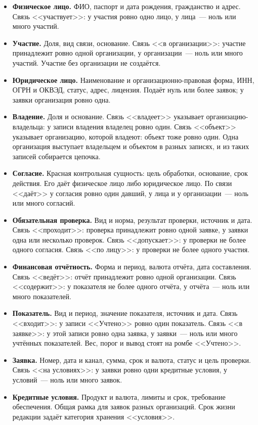 \begin{itemize}
\item \textbf{Физическое лицо.} ФИО, паспорт и дата рождения, гражданство и адрес. Связь <<участвует>>: у участия ровно одно лицо, у лица~--- ноль или много участий.
\item \textbf{Участие.} Доля, вид связи, основание. Связь <<в организации>>: участие принадлежит ровно одной организации, у организации~--- ноль или много участий. Участие без организации не создаётся.
\item \textbf{Юридическое лицо.} Наименование и организационно-правовая форма, ИНН, ОГРН и ОКВЭД, статус, адрес, лицензия. Подаёт нуль или более заявок; у заявки организация ровно одна.
\item \textbf{Владение.} Доля и основание. Связь <<владеет>> указывает организацию-владельца: у записи владения владелец ровно один. Связь <<объект>> указывает организацию, которой владеют: объект тоже ровно один. Одна организация выступает владельцем и объектом в разных записях, и из таких записей собирается цепочка.
\item \textbf{Согласие.} Красная контрольная сущность: цель обработки, основание, срок действия. Его даёт физическое лицо либо юридическое лицо. По связи <<даёт>> у согласия ровно один давший, у лица и у организации~--- ноль или много согласий.
\item \textbf{Обязательная проверка.} Вид и норма, результат проверки, источник и дата. Связь <<проходит>>: проверка принадлежит ровно одной заявке, у заявки одна или несколько проверок. Связь <<допускает>>: у проверки не более одного согласия. Связь <<по лицу>>: у проверки не более одного участия.
\item \textbf{Финансовая отчётность.} Форма и период, валюта отчёта, дата составления. Связь <<ведёт>>: отчёт принадлежит ровно одной организации. Связь <<содержит>>: у показателя не более одного отчёта, у отчёта~--- ноль или много показателей.
\item \textbf{Показатель.} Вид и период, значение показателя, источник и дата. Связь <<входит>>: у записи <<Учтено>> ровно один показатель. Связь <<в заявке>>: у этой записи ровно одна заявка, у заявки~--- ноль или много учтённых показателей. Вес, порог и вывод стоят на ромбе <<Учтено>>.
\item \textbf{Заявка.} Номер, дата и канал, сумма, срок и валюта, статус и цель проверки. Связь <<на условиях>>: у заявки ровно одни кредитные условия, у условий~--- ноль или много заявок.
\item \textbf{Кредитные условия.} Продукт и валюта, лимиты и срок, требование обеспечения. Общая рамка для заявок разных организаций. Срок жизни редакции задаёт категория хранения <<условия>>.

\end{itemize}
